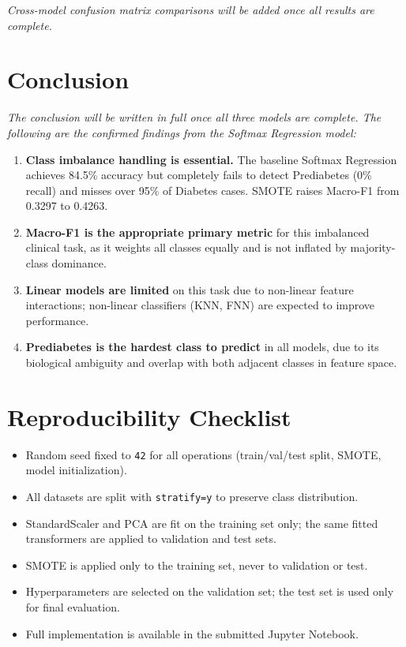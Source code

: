 \documentclass[12pt,a4paper]{article}
\begin{document}
\textit{Cross-model confusion matrix comparisons will be added once all results are complete.}

\section{Conclusion}

\textit{The conclusion will be written in full once all three models are complete. The following are the confirmed findings from the Softmax Regression model:}

\begin{enumerate}[leftmargin=2cm]
    \item \textbf{Class imbalance handling is essential.} The baseline Softmax Regression achieves 84.5\% accuracy but completely fails to detect Prediabetes (0\% recall) and misses over 95\% of Diabetes cases. SMOTE raises Macro-F1 from 0.3297 to 0.4263.
    \item \textbf{Macro-F1 is the appropriate primary metric} for this imbalanced clinical task, as it weights all classes equally and is not inflated by majority-class dominance.
    \item \textbf{Linear models are limited} on this task due to non-linear feature interactions; non-linear classifiers (KNN, FNN) are expected to improve performance.
    \item \textbf{Prediabetes is the hardest class to predict} in all models, due to its biological ambiguity and overlap with both adjacent classes in feature space.
\end{enumerate}

\appendix
\section{Reproducibility Checklist}

\begin{itemize}
    \item Random seed fixed to \texttt{42} for all operations (train/val/test split, SMOTE, model initialization).
    \item All datasets are split with \texttt{stratify=y} to preserve class distribution.
    \item StandardScaler and PCA are fit on the training set only; the same fitted transformers are applied to validation and test sets.
    \item SMOTE is applied only to the training set, never to validation or test.
    \item Hyperparameters are selected on the validation set; the test set is used only for final evaluation.
    \item Full implementation is available in the submitted Jupyter Notebook.
\end{itemize}

\end{document}
